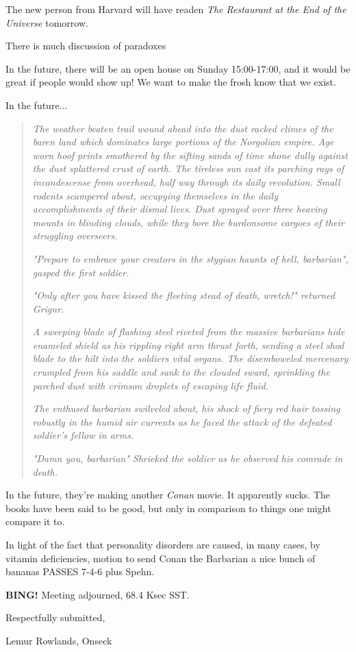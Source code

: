 \documentclass[10pt]{article}
\newcommand{\bing}{{\bf BING!} }
\newcommand{\ps}{ plus Spehn\xspace}
\newcommand{\onseck}{Lemur Rowlands, Onseck}
\begin{document}
The new person from Harvard will have readen \emph{The Restaurant
at the End of the Universe} tomorrow.

There is much discussion of paradoxes

In the future, there will be an open house on Sunday 15:00-17:00, 
and it would be great if people would show up!  We want to make the
frosh know that we exist.  

In the future...
\begin{quote}

\emph{The weather beaten trail wound ahead into the dust racked 
climes of the baren land which dominates large portions of the 
Norgolian empire.  Age worn hoof prints smothered by the sifting 
sands of time shone dully against the dust splattered crust of 
earth.  The tireless sun cast its parching rays of incandescense 
from overhead, half way through its daily revolution.  Small 
rodents scampered about, occupying themselves in the daily 
accomplishments of their dismal lives.  Dust sprayed over three 
heaving mounts in blinding clouds, while they bore the burdonsome 
cargoes of their struggling overseers.}

\emph{"Prepare to embrace your creators in the stygian haunts of 
hell, barbarian", gasped the first soldier.}

\emph{"Only after you have kissed the fleeting stead of death, 
wretch!" returned Grignr.}

\emph{A sweeping blade of flashing steel riveted from the massive 
barbarians hide enameled shield as his rippling right arm thrust 
forth, sending a steel shod blade to the hilt into the soldiers 
vital organs.  The disemboweled mercenary crumpled from his 
saddle and sank to the clouded sward, sprinkling the parched dust 
with crimson droplets of escaping life fluid.}

\emph{The enthused barbarian swilveled about, his shock of fiery 
red hair tossing robustly in the humid air currents as he faced 
the attack of the defeated soldier's fellow in arms.}

\emph{"Damn you, barbarian" Shrieked the soldier as he observed 
his comrade in death.}

\end{quote}

In the future, they're making another \emph{Conan} movie.  It
apparently sucks.  The books have been said to be good, but
only in comparison to things one might compare it to.

In light of the fact that personality disorders are caused,
in many cases, by vitamin deficiencies, motion to send Conan
the Barbarian a nice bunch of bananas PASSES 7-4-6\ps.

\bing
\noindent
Meeting adjourned, 68.4 Ksec SST.

\vspace{18pt}

\centerline{Respectfully submitted,}
\centerline{\onseck}
\end{document}
